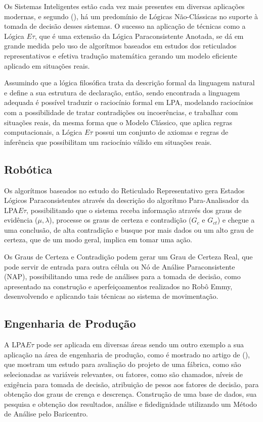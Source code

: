 Os Sistemas Inteligentes estão cada vez mais presentes em diversas aplicações modernas, e segundo \citeauthor{JISF2011}(\citeyear{JISF2011}), há um predomínio de Lógicas Não-Clássicas no suporte à tomada de decisão desses sistemas. O sucesso na aplicação de técnicas como a Lógica $E\tau$, que é uma extensão da Lógica Paraconsistente Anotada, se dá em grande medida pelo uso de algorítmos baseados em estudos dos reticulados representativos e efetiva tradução matemática gerando um modelo eficiente aplicado em situações reais.

Assumindo que a lógica filosófica trata da descrição formal da linguagem natural e define a sua estrutura de declaração, então, sendo encontrada a linguagem adequada é possível traduzir o raciocínio formal em LPA, modelando raciocínios com a possibilidade de tratar contradições ou incoerências, e trabalhar com situações reais, da mesma forma que o Modelo Clássico, que aplica regras computacionais, a Lógica $E\tau$ possui um conjunto de axiomas e regras de inferência que possibilitam um raciocínio válido em situações reais.


\subsection{Robótica}

Os algorítmos baseados no estudo do Reticulado Representativo gera Estados Lógicos Paraconsistentes através da descrição do algorítmo Para-Analisador da LPA$E\tau$, possibilitando que o sistema receba informação através dos graus de evidência ($\mu, \lambda$), processe os graus de certeza e contradição ($G_c$ e $G_{ct}$) e chegue a uma conclusão, de alta contradição e busque por mais dados ou um alto grau de certeza, que de um modo geral, implica em tomar uma ação. 

Os Graus de Certeza e Contradição podem gerar um Grau de Certeza Real, que pode servir de entrada para outra célula ou Nó de Análise Paraconsistente (NAP), possibilitando uma rede de análises para a tomada de decisão, como apresentado na construção e aperfeiçoamentos realizados no Robô Emmy, \cite{JoaoInacio}\cite{ClaudioRodrigoTorres} desenvolvendo e aplicando tais técnicas ao sistema de movimentação.


\subsection{Engenharia de Produção}

A LPA$E\tau$ pode ser aplicada em diversas áreas sendo um outro exemplo a sua aplicação na área de engenharia de produção, como é mostrado no artigo de \citeauthor{FabioIsraelJair}(\citeyear{FabioIsraelJair}), que mostram um estudo para avaliação do projeto de uma fábrica, como são selecionadas as variáveis relevantes, ou fatores, como são chamados, níveis de exigência para tomada de decisão, 
atribuição de pesos aos fatores de decisão, para obtenção dos graus de crença e descrença. 
Construção de uma base de dados, sua pesquisa e obtenção dos resultados, análise e fidedignidade utilizando um Método de Análise pelo Baricentro.


